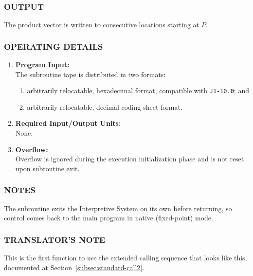 \subsubsection*{OUTPUT}
The product vector is written to consecutive locations starting at $P$.

\subsubsection*{OPERATING DETAILS}

\begin{enumerate}[leftmargin=1.5em, itemsep=6pt]
    \item \textbf{Program Input:} \\
    The subroutine tape is distributed in two formats:
    \begin{enumerate}[label=\alph*), itemsep=2pt, topsep=2pt]
        \item arbitrarily relocatable, hexadecimal format, compatible with \texttt{J1-10.0}; and
        \item arbitrarily relocatable, decimal coding sheet format.
    \end{enumerate}
    
    \item \textbf{Required Input/Output Units:} \\
    None.
    
    \item \textbf{Overflow:} \\
    Overflow is ignored during the execution initialization phase and is not reset upon subroutine exit.
\end{enumerate}

\subsubsection*{NOTES}
The subroutine exits the Interpretive System on its own before returning, so control comes back to the main program in native (fixed-point) mode.

\subsubsection*{TRANSLATOR'S NOTE}
This is the first function to use the extended calling sequence that looks like this, documented at Section~\ref{subsec:standard-call2}.

